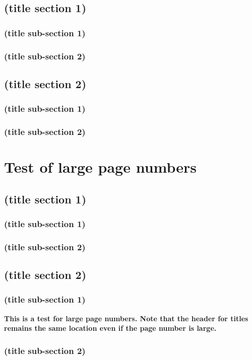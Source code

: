 \section{(title section 1)}
\subsection{(title sub-section 1)}
\subsection{(title sub-section 2)}
\section{(title section 2)}
\subsection{(title sub-section 1)}
\subsection{(title sub-section 2)}
\chapter{Test of large page numbers}
\section{(title section 1)}
\subsection{(title sub-section 1)}
\subsection{(title sub-section 2)}
\section{(title section 2)}
\setcounter{page}{1000}
\subsection{(title sub-section 1)}
\textbf{This is a test for large page numbers. Note that the header for titles remains the same location even if the page number is large.}

\subsection{(title sub-section 2)}

